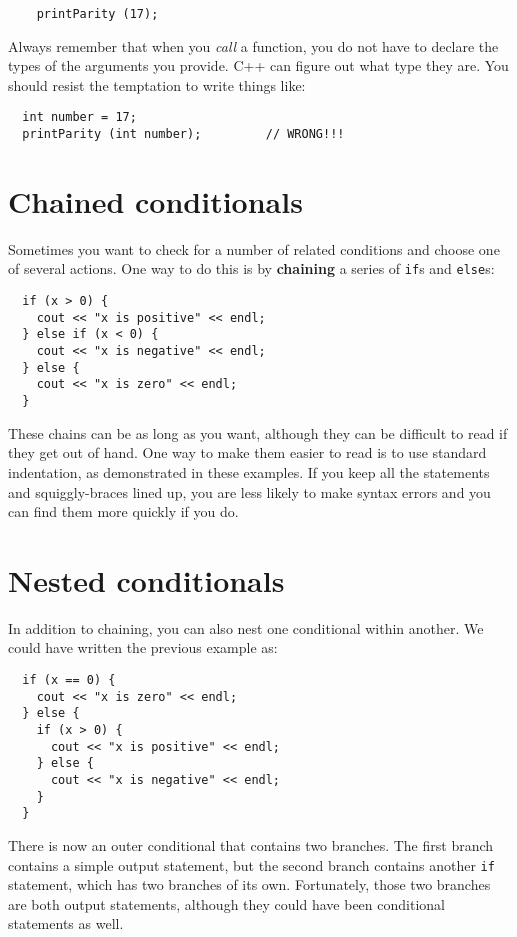 \begin{lstlisting}
    printParity (17);
\end{lstlisting}
%
Always remember that when you {\em call} a function, you do
not have to declare the types of the arguments you provide.
C++ can figure out what type they are.  You should resist the
temptation to write things like:

\begin{lstlisting}
  int number = 17;
  printParity (int number);         // WRONG!!!
\end{lstlisting}

\section {Chained conditionals}

Sometimes you want to check for a number of related conditions
and choose one of several actions.  One way to do this is by
{\bf chaining} a series of {\tt if}s and {\tt else}s:

\begin{lstlisting}
  if (x > 0) {
    cout << "x is positive" << endl;
  } else if (x < 0) {
    cout << "x is negative" << endl;
  } else {
    cout << "x is zero" << endl;
  }
\end{lstlisting}
%
These chains can be as long as you want, although they can
be difficult to read if they get out of hand.  One way to
make them easier to read is to use standard indentation,
as demonstrated in these examples.  If you keep all the
statements and squiggly-braces lined up, you are less
likely to make syntax errors and you can find them more
quickly if you do.

\section{Nested conditionals}

In addition to chaining, you can also nest one conditional
within another.  We could have written the previous example
as:

\begin{lstlisting}
  if (x == 0) {
    cout << "x is zero" << endl;
  } else {
    if (x > 0) {
      cout << "x is positive" << endl;
    } else {
      cout << "x is negative" << endl;
    }
  }
\end{lstlisting}
%
There is now an outer conditional that contains two branches.  The
first branch contains a simple output statement, but the second
branch contains another {\tt if} statement, which has two branches
of its own.  Fortunately, those two branches are both output
statements, although they could have been conditional statements as
well.

